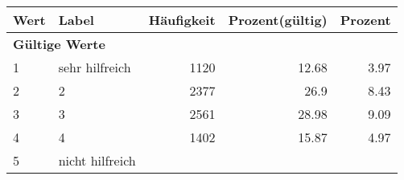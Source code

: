      \begin{longtable}{lXrrr}
     \toprule
     \textbf{Wert} & \textbf{Label} & \textbf{Häufigkeit} & \textbf{Prozent(gültig)} & \textbf{Prozent} \\
     \endhead
     \midrule
     \multicolumn{5}{l}{\textbf{Gültige Werte}}\\

     1 &
     \multicolumn{1}{X}{ sehr hilfreich   } &


       \num{1120} &
       \num[round-mode=places,round-precision=2]{12,68} &
         \num[round-mode=places,round-precision=2]{3,97} \\

     2 &
     \multicolumn{1}{X}{ 2   } &


       \num{2377} &
       \num[round-mode=places,round-precision=2]{26,9} &
         \num[round-mode=places,round-precision=2]{8,43} \\

     3 &
     \multicolumn{1}{X}{ 3   } &


       \num{2561} &
       \num[round-mode=places,round-precision=2]{28,98} &
         \num[round-mode=places,round-precision=2]{9,09} \\

     4 &
     \multicolumn{1}{X}{ 4   } &


       \num{1402} &
       \num[round-mode=places,round-precision=2]{15,87} &
         \num[round-mode=places,round-precision=2]{4,97} \\

     5 &
     \multicolumn{1}{X}{ nicht hilfreich   } &



\end{longtable}
